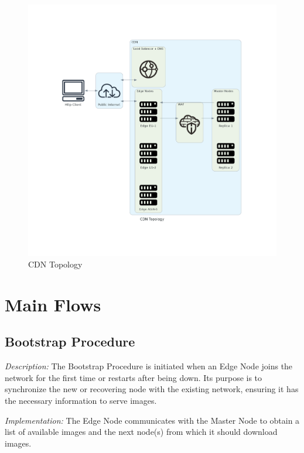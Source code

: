 \documentclass{article}
\begin{document}
  \begin{figure}
    \centering
    \includegraphics[width=1.0\textwidth]{imgs/cdn_topology}
    \caption{CDN Topology}
    \label{fig:cdn topology}
  \end{figure}






  \newpage







  \section{Main Flows}

  \subsection{Bootstrap Procedure}

  \textit{Description:} The Bootstrap Procedure is initiated when an Edge Node joins the network for the first time or
  restarts after being down. Its purpose is to synchronize the new or recovering node with the existing network,
  ensuring it has the necessary information to serve images.

  \textit{Implementation:} The Edge Node communicates with the Master Node to obtain a list of available images
  and the next node(s) from which it should download images.
\end{document}
